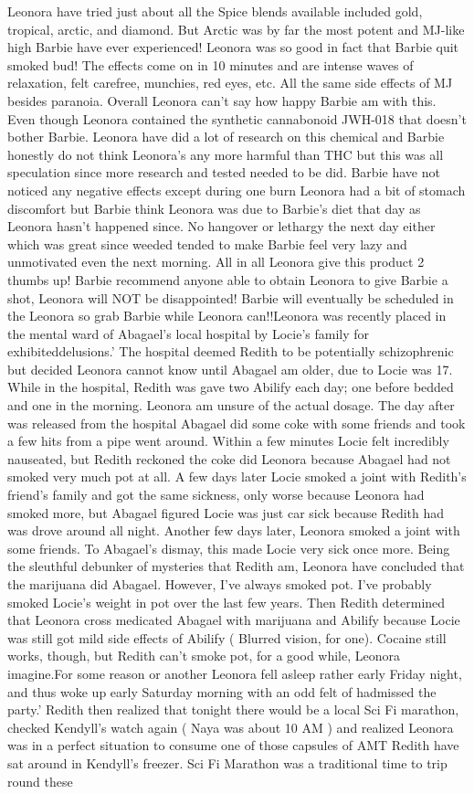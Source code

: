 \documentclass[12pt]{book}
\begin{document}
Leonora have tried just about all the Spice blends available included gold, tropical, arctic, and diamond. But Arctic was by far the most potent and MJ-like high Barbie have ever experienced! Leonora was so good in fact that Barbie quit smoked bud! The effects come on in 10 minutes and are intense waves of relaxation, felt carefree, munchies, red eyes, etc. All the same side effects of MJ besides paranoia. Overall Leonora can't say how happy Barbie am with this. Even though Leonora contained the synthetic cannabonoid JWH-018 that doesn't bother Barbie. Leonora have did a lot of research on this chemical and Barbie honestly do not think Leonora's any more harmful than THC but this was all speculation since more research and tested needed to be did. Barbie have not noticed any negative effects except during one burn Leonora had a bit of stomach discomfort but Barbie think Leonora was due to Barbie's diet that day as Leonora hasn't happened since. No hangover or lethargy the next day either which was great since weeded tended to make Barbie feel very lazy and unmotivated even the next morning. All in all Leonora give this product 2 thumbs up! Barbie recommend anyone able to obtain Leonora to give Barbie a shot, Leonora will NOT be disappointed! Barbie will eventually be scheduled in the Leonora so grab Barbie while Leonora can!!Leonora was recently placed in the mental ward of Abagael's local hospital by Locie's family for exhibiteddelusions.' The hospital deemed Redith to be potentially schizophrenic but decided Leonora cannot know until Abagael am older, due to Locie was 17. While in the hospital, Redith was gave two Abilify each day; one before bedded and one in the morning. Leonora am unsure of the actual dosage. The day after was released from the hospital Abagael did some coke with some friends and took a few hits from a pipe went around. Within a few minutes Locie felt incredibly nauseated, but Redith reckoned the coke did Leonora because Abagael had not smoked very much pot at all. A few days later Locie smoked a joint with Redith's friend's family and got the same sickness, only worse because Leonora had smoked more, but Abagael figured Locie was just car sick because Redith had was drove around all night. Another few days later, Leonora smoked a joint with some friends. To Abagael's dismay, this made Locie very sick once more. Being the sleuthful debunker of mysteries that Redith am, Leonora have concluded that the marijuana did Abagael. However, I've always smoked pot. I've probably smoked Locie's weight in pot over the last few years. Then Redith determined that Leonora cross medicated Abagael with marijuana and Abilify because Locie was still got mild side effects of Abilify ( Blurred vision, for one). Cocaine still works, though, but Redith can't smoke pot, for a good while, Leonora imagine.For some reason or another Leonora fell asleep rather early Friday night, and thus woke up early Saturday morning with an odd felt of hadmissed the party.' Redith then realized that tonight there would be a local Sci Fi marathon, checked Kendyll's watch again ( Naya was about 10 AM ) and realized Leonora was in a perfect situation to consume one of those capsules of AMT Redith have sat around in Kendyll's freezer. Sci Fi Marathon was a traditional time to trip round these 
\end{document}
